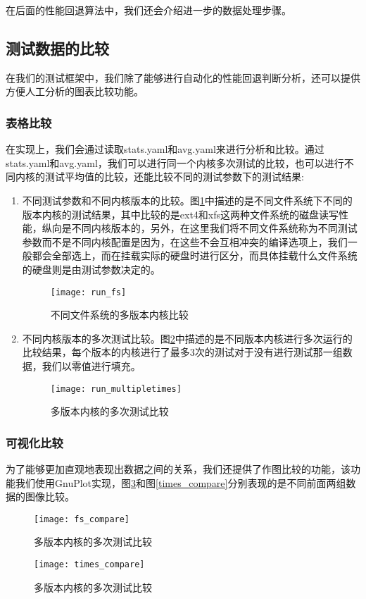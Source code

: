 在后面的性能回退算法中，我们还会介绍进一步的数据处理步骤。
\subsection{测试数据的比较}
在我们的测试框架中，我们除了能够进行自动化的性能回退判断分析，还可以提供方便人工分析的图表比较功能。

\subsubsection{表格比较}
在实现上，我们会通过读取stats.yaml和avg.yaml来进行分析和比较。通过stats.yaml和avg.yaml，我们可以进行同一个内核多次测试的比较，也可以进行不同内核的测试平均值的比较，还能比较不同的测试参数下的测试结果:
\begin{enumerate}
\item 不同测试参数和不同内核版本的比较。图\ref{fig:run_fs}中描述的是不同文件系统下不同的版本内核的测试结果，其中比较的是ext4和xfs这两种文件系统的磁盘读写性能，纵向是不同内核版本的，另外，在这里我们将不同文件系统称为不同测试参数而不是不同内核配置是因为，在这些不会互相冲突的编译选项上，我们一般都会全部选上，而在挂载实际的硬盘时进行区分，而具体挂载什么文件系统的硬盘则是由测试参数决定的。

\begin{figure}[H]
\centering
\texttt{[image: run\_fs]}
\caption{不同文件系统的多版本内核比较}
\label{fig:run_fs}
\end{figure}

\item 不同内核版本的多次测试比较。图\ref{fig:run_multipletimes}中描述的是不同版本内核进行多次运行的比较结果，每个版本的内核进行了最多3次的测试对于没有进行测试那一组数据，我们以零值进行填充。

\begin{figure}[H]
\centering
\texttt{[image: run\_multipletimes]}
\caption{多版本内核的多次测试比较}
\label{fig:run_multipletimes}
\end{figure}

\end{enumerate}

\subsubsection{可视化比较}

为了能够更加直观地表现出数据之间的关系，我们还提供了作图比较的功能，该功能我们使用GnuPlot实现，图\ref{fig:fs_compare}和图\ref{times_compare}分别表现的是不同前面两组数据的图像比较。

\begin{figure}[H]
\centering
\texttt{[image: fs\_compare]}
\caption{多版本内核的多次测试比较}
\label{fig:fs_compare}
\end{figure}

\begin{figure}[H]
\centering
\texttt{[image: times\_compare]}
\caption{多版本内核的多次测试比较}
\label{fig:times_compare}
\end{figure}



